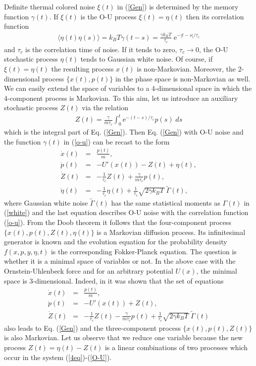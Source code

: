 \documentclass[authoryear,draft,1p,times]{elsarticle}
\renewcommand{\=}{\stackrel{\mathrm{d}}{=}}
\begin{document}
Definite thermal colored noise $\xi(t) $ in (\ref{Gen}) 
is determined by the memory function 
$\gamma(t)$.
If $\xi(t) $  is the  O-U process $\xi(t) =\eta(t)$ 
then  its correlation function 
%
\begin{eqnarray}  \label{o-u}
\langle \eta(t) \eta(s)\rangle = k_BT \gamma(t-s)  
=\frac{\gamma k_BT}{\tau_c} \;\mbox{e}^{-|t-s|/\tau_c}
\end{eqnarray}
% 
and $\tau_c$ is the correlation time of  noise. 
If it  tends to zero, $\tau_c \to 0$, the O-U stochastic 
process $\eta(t)$ tends to Gaussian white noise. 
Of course, if $\xi(t)  = \eta(t)$  the resulting process $x(t)$ 
is non-Markovian. 
Moreover, the 2-dimensional process $\{x(t), p(t)\}$ in the phase space 
is non-Markovian as well.   
We can easily extend the space of variables to a  4-dimensional space 
in which the 4-component process is Markovian. To this aim, let us 
introduce an auxiliary  stochastic process $Z(t)$  via the relation    
%
\begin{eqnarray}
\label{Z(t)}
Z(t) = \frac{\gamma}{m\tau_c} \int_0^t \mbox{e}^{-(t-s)/\tau_c}p(s)\;ds 
\end{eqnarray}
%
which is the integral part of Eq. (\ref{Gen}). 
Then Eq. (\ref{Gen}) with O-U  noise and 
the function $\gamma(t)$ in (\ref{o-u}) can be recast to the form  
%
\begin{eqnarray}
\label{4eq}
\dot x(t)&=& \frac {p(t)}{m},  \\
\dot p(t)&=& - U'(x(t)) -Z(t) + \eta(t),   \\
\dot Z(t)&=& -\frac{1}{\tau_c} Z(t) +\frac{\gamma}{m\tau_c} p(t),  \\
\label{O-U}
\dot \eta(t)&=& -\frac{1}{\tau_c} \eta(t) 
+\frac{1}{\tau_c} \sqrt{2\gamma k_BT} \;\widetilde\Gamma(t),
\end{eqnarray} 
%
where Gaussian white noise  $\widetilde\Gamma(t)$ has the same statistical
moments as $\Gamma(t)$ in (\ref{white}) and the last equation describes 
O-U noise with the correlation function (\ref{o-u}). 
From the Doob theorem it 
follows that the four-component process $\{x(t), p(t), Z(t), \eta(t)\}$ 
is a Markovian diffusion process. Its infinitesimal generator is known 
and the evolution equation for the  probability density $f(x,p,y,\eta, t)$  
is the corresponding Fokker-Planck equation. 
The question is whether it is a  minimal space of variables or not. 
In the above case with the Ornstein-Uhlenbeck force and for an arbitrary 
potential $U(x)$, the minimal 
space is 3-dimensional. Indeed, in \cite{straub86} it was shown that 
the set of equations 
%
\begin{eqnarray}
\label{3eq}
\dot x(t) &=& \frac {p(t)}{m},    \\
\dot p(t) &=&  - U'(x(t)) + Z(t),    \\
\dot Z(t) &=& -\frac{1}{\tau_c} Z(t) - \frac{\gamma}{m\tau_c} p(t) 
+\frac{1}{\tau_c} \sqrt{2\gamma k_BT}\; \widetilde\Gamma(t)
\end{eqnarray} 
%
also leads to Eq. (\ref{Gen}) and the  three-component 
process $\{x(t), p(t), Z(t)\}$ is also Markovian. 
Let us observe that we reduce one variable because  
the new process $Z(t) = \eta(t)-Z(t)$ is a linear combinations
of two processes which occur in the system (\ref{4eq})-(\ref{O-U}). 
\end{document}

